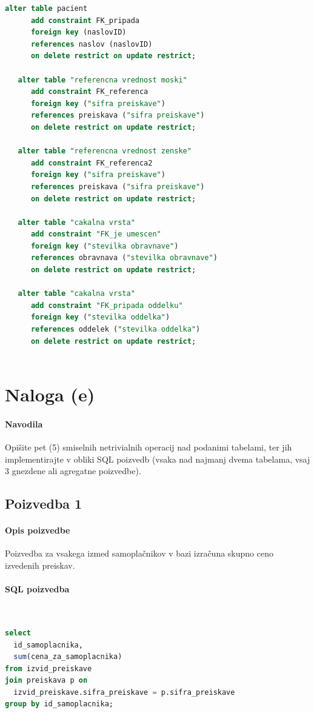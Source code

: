\documentclass[a4paper,12pt]{report}
\begin{document}
\begin{lstlisting}[language=SQL]
   alter table pacient 
      add constraint FK_pripada 
      foreign key (naslovID)
      references naslov (naslovID) 
      on delete restrict on update restrict;
   
   alter table "referencna vrednost moski" 
      add constraint FK_referenca 
      foreign key ("sifra preiskave")
      references preiskava ("sifra preiskave") 
      on delete restrict on update restrict;
   
   alter table "referencna vrednost zenske" 
      add constraint FK_referenca2 
      foreign key ("sifra preiskave")
      references preiskava ("sifra preiskave") 
      on delete restrict on update restrict;
   
   alter table "cakalna vrsta" 
      add constraint "FK_je umescen" 
      foreign key ("stevilka obravnave")
      references obravnava ("stevilka obravnave") 
      on delete restrict on update restrict;
   
   alter table "cakalna vrsta" 
      add constraint "FK_pripada oddelku" 
      foreign key ("stevilka oddelka")
      references oddelek ("stevilka oddelka") 
      on delete restrict on update restrict;
   
\end{lstlisting}

\section*{Naloga (e)}
\paragraph{Navodila}
\begin{em}
  Opišite pet (5) smiselnih netrivialnih operacij nad podanimi tabelami, ter jih implementirajte v obliki SQL poizvedb (vsaka nad najmanj dvema tabelama, vsaj 3 gnezdene ali agregatne poizvedbe).
\end{em}

\subsection*{Poizvedba 1}
\paragraph{Opis poizvedbe}
Poizvedba za vsakega izmed samoplačnikov v bazi izračuna skupno ceno izvedenih preiskav.

\paragraph{SQL poizvedba}\mbox{}\\
\begin{lstlisting}[language = SQL]
select
  id_samoplacnika,
  sum(cena_za_samoplacnika)
from izvid_preiskave
join preiskava p on 
  izvid_preiskave.sifra_preiskave = p.sifra_preiskave
group by id_samoplacnika;
\end{lstlisting}
\end{document}
